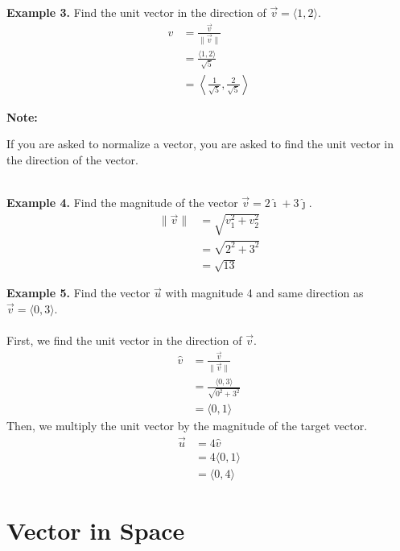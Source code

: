\documentclass{report}
\begin{document}
\newpage
\noindent\textbf{Example 3. } Find the unit vector in the direction of $\vec{v} = \langle 1, 2 \rangle$.
\begin{align*}
    \hat{v} & = \frac{\vec{v}}{\lVert \vec{v} \rVert}                             \\
            & = \frac{\langle 1, 2 \rangle}{\sqrt{5}}                             \\
            & = \left\langle \frac{1}{\sqrt{5}}, \frac{2}{\sqrt{5}} \right\rangle
\end{align*}
\begin{framed}
    \noindent\textbf{Note: }

    \noindent If you are asked to normalize a vector, you are asked to find the unit vector in the direction of the vector.
\end{framed}
~\\
\noindent\textbf{Example 4. } Find the magnitude of the vector $\vec{v} = 2\hat{\imath} + 3\hat{\jmath}$.
\begin{align*}
    \lVert \vec{v} \rVert & = \sqrt{v_1^2 + v_2^2} \\
                          & = \sqrt{2^2 + 3^2}     \\
                          & = \sqrt{13}
\end{align*}

\noindent\textbf{Example 5. } Find the vector $\vec{u}$ with magnitude 4 and same direction as $\vec{v} = \langle 0, 3 \rangle$.
~\\\\
\noindent First, we find the unit vector in the direction of $\vec{v}$.
\begin{align*}
    \hat{v} & = \frac{\vec{v}}{\lVert \vec{v} \rVert}         \\
            & = \frac{\langle 0, 3 \rangle}{\sqrt{0^2 + 3^2}} \\
            & = \langle 0, 1 \rangle
\end{align*}
Then, we multiply the unit vector by the magnitude of the target vector.
\begin{align*}
    \vec{u} & = 4\hat{v}              \\
            & = 4\langle 0, 1 \rangle \\
            & = \langle 0, 4 \rangle
\end{align*}

\chapter{Vector in Space}
\end{document}

